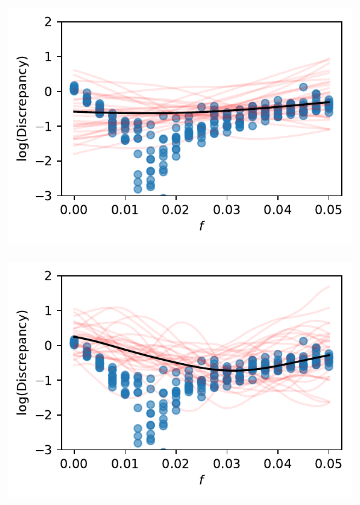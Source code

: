 \begin{figure}[htbp]
    \centering
    \begin{subfigure}[b]{0.5\textwidth}
        \centering
        \includegraphics[width=\textwidth]{
            ../champagne_GP_images/initial_f_slice_log_discrep.pdf
        }
    \end{subfigure}%
    \hfill%
    \begin{subfigure}[b]{0.5\textwidth}
        \centering
        \includegraphics[width=\textwidth]{
            ../champagne_GP_images/f_slice_100_bolfi_updates_log_discrep.pdf
        }
    \end{subfigure}
    \hfill%
    \begin{subfigure}[b]{0.5\textwidth}
        \centering

\end{subfigure}
\end{figure}
